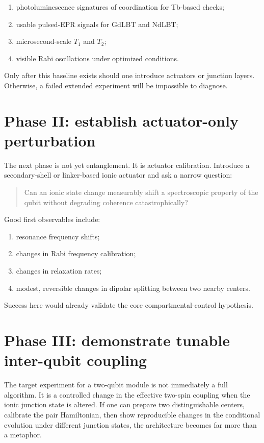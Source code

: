\documentclass[11pt]{report}
\newcommand{\ham}{Hamiltonian}
\theoremstyle{definition}
\begin{document}
\begin{enumerate}[leftmargin=2em]
\item photoluminescence signatures of coordination for Tb-based checks;
\item usable pulsed-EPR signals for GdLBT and NdLBT;
\item microsecond-scale $T_1$ and $T_2$;
\item visible Rabi oscillations under optimized conditions.
\end{enumerate}

Only after this baseline exists should one introduce actuators or junction layers. Otherwise, a failed extended experiment will be impossible to diagnose.

\section{Phase II: establish actuator-only perturbation}
The next phase is not yet entanglement. It is actuator calibration. Introduce a secondary-shell or linker-based ionic actuator and ask a narrow question:
\begin{quote}
Can an ionic state change measurably shift a spectroscopic property of the qubit without degrading coherence catastrophically?
\end{quote}

Good first observables include:

\begin{enumerate}[leftmargin=2em]
\item resonance frequency shifts;
\item changes in Rabi frequency calibration;
\item changes in relaxation rates;
\item modest, reversible changes in dipolar splitting between two nearby centers.
\end{enumerate}

Success here would already validate the core compartmental-control hypothesis.

\section{Phase III: demonstrate tunable inter-qubit coupling}
The target experiment for a two-qubit module is not immediately a full algorithm. It is a controlled change in the effective two-spin coupling when the ionic junction state is altered. If one can prepare two distinguishable centers, calibrate the pair \ham{}, then show reproducible changes in the conditional evolution under different junction states, the architecture becomes far more than a metaphor.
\end{document}

